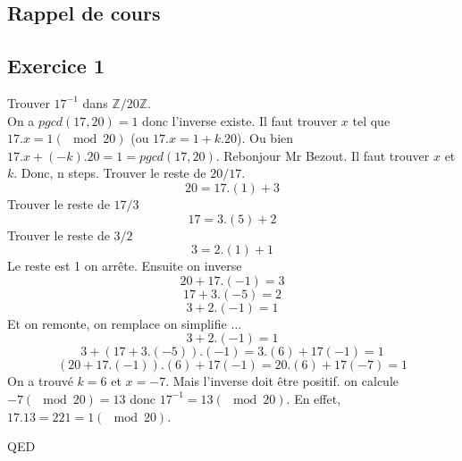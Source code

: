 \documentclass[]{book}
\theoremstyle{definition}
\newcommand{\bb}[1]{\mathbb{#1}}
\newcommand{\Z}{\bb{Z}}
\begin{document}
\subsection*{Rappel de cours}



\newpage
\subsection*{Exercice 1}
Trouver $17^{-1}$ dans $\Z/20\Z$.\\
On a $pgcd(17,20) = 1$ donc l'inverse existe. Il faut trouver $x$ tel que $17.x = 1 (\mod 20)$ (ou $17.x = 1 + k.20$). Ou bien $17.x + (-k).20 = 1 = pgcd(17,20)$. Rebonjour Mr Bezout. Il 
faut trouver $x$ et $k$. Donc, n steps. Trouver le reste de $20/17$.
$$20 = 17.(1) + 3$$
Trouver le reste de $17/3$
$$17=3.(5) + 2$$
Trouver le reste de $3/2$
$$3=2.(1)+1$$
Le reste est 1 on arr\^ete. Ensuite on inverse
$$20 + 17.(-1) = 3$$
$$17 + 3.(-5) = 2$$
$$3+2.(-1)=1$$
Et on remonte, on remplace on simplifie $\ldots$
$$3+2.(-1)=1$$
$$3+(17 + 3.(-5)).(-1)= 3.(6) + 17(-1) =1$$
$$(20 + 17.(-1)).(6) + 17(-1) = 20.(6) + 17(-7) = 1$$
On a trouv\'e $k=6$ et $x=-7$. Mais l'inverse doit \^etre positif. on calcule $-7 (\mod 20) = 13$ donc $17^{-1} = 13 (\mod 20)$. En effet, $17.13 = 221 = 1 (\mod 20)$.


QED
\end{document}
